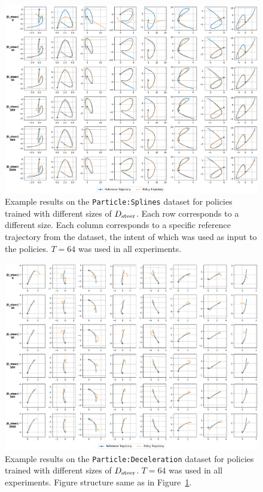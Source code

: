 \documentclass[nohyperref]{article}
\begin{document}
\begin{figure}
    \centering
    \includegraphics[width=\textwidth,keepaspectratio]{figures/iclr_plots/splines_steering_grid.png}
    \vspace{-1em}
    \caption{Example results on the \texttt{Particle:Splines} dataset for policies trained with different sizes of $D_{\mathrm{steer}}$.  Each row corresponds to a different size. Each column corresponds to a specific reference trajectory from the dataset, the intent of which was used as input to the policies. $T=64$ was used in all experiments.}
    \label{fig:splines_steering_grid}
\end{figure}

\begin{figure}
    \centering
    \includegraphics[width=\textwidth,keepaspectratio]{figures/iclr_plots/deceleration_steering_grid.png}
    \vspace{-1em}
    \caption{Example results on the \texttt{Particle:Deceleration} dataset for policies trained with different sizes of $D_{\mathrm{steer}}$. $T=64$ was used in all experiments. Figure structure same as in Figure~\ref{fig:splines_steering_grid}. }
    \label{fig:deceleration_steering_grid}
\end{figure}
\end{document}
